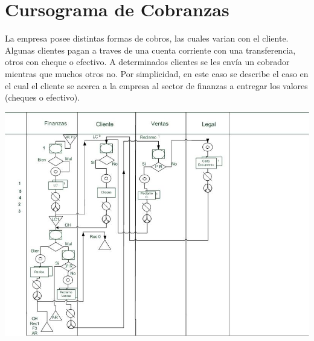 \pagebreak
\section{Cursograma de Cobranzas}
La empresa posee distintas formas de cobros, las cuales varian con el cliente. Algunas clientes pagan a traves de una cuenta corriente con una transferencia, otros con cheque o efectivo. A determinados clientes se les envía un cobrador mientras que muchos otros no.
Por simplicidad, en este caso se describe el caso en el cual el cliente se acerca a la empresa al sector de finanzas a entregar los valores (cheques o efectivo).

\includegraphics[scale=0.7]{Empresa/Circuitos/Cobranzas/cursograma-manual-cobranzas.jpg}

\pagebreak
